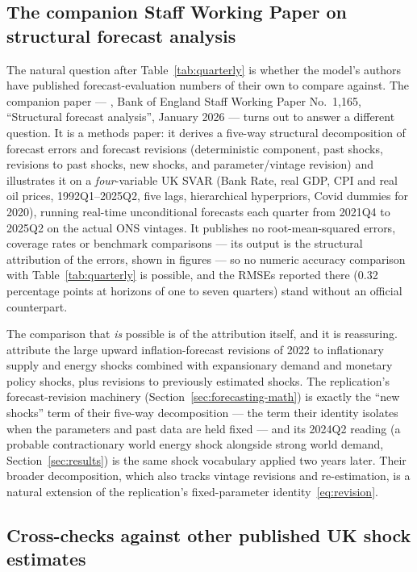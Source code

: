 \subsection{The companion Staff Working Paper on structural forecast analysis}
\label{sec:comparison-swp}

The natural question after Table~\ref{tab:quarterly} is whether the model's authors have published forecast-evaluation numbers of their own to compare against. The companion paper --- \citet{brignone2026}, Bank of England Staff Working Paper No.~1{,}165, ``Structural forecast analysis'', January 2026 --- turns out to answer a different question. It is a methods paper: it derives a five-way structural decomposition of forecast errors and forecast revisions (deterministic component, past shocks, revisions to past shocks, new shocks, and parameter/vintage revision) and illustrates it on a \emph{four}-variable UK SVAR (Bank Rate, real GDP, CPI and real oil prices, 1992Q1--2025Q2, five lags, hierarchical \citealp{giannone2015} hyperpriors, Covid dummies for 2020), running real-time unconditional forecasts each quarter from 2021Q4 to 2025Q2 on the actual ONS vintages. It publishes no root-mean-squared errors, coverage rates or benchmark comparisons --- its output is the structural attribution of the errors, shown in figures --- so no numeric accuracy comparison with Table~\ref{tab:quarterly} is possible, and the RMSEs reported there (0.32 percentage points at horizons of one to seven quarters) stand without an official counterpart.

The comparison that \emph{is} possible is of the attribution itself, and it is reassuring. \citet{brignone2026} attribute the large upward inflation-forecast revisions of 2022 to inflationary supply and energy shocks combined with expansionary demand and monetary policy shocks, plus revisions to previously estimated shocks. The replication's forecast-revision machinery (Section~\ref{sec:forecasting-math}) is exactly the ``new shocks'' term of their five-way decomposition --- the term their identity isolates when the parameters and past data are held fixed --- and its 2024Q2 reading (a probable contractionary world energy shock alongside strong world demand, Section~\ref{sec:results}) is the same shock vocabulary applied two years later. Their broader decomposition, which also tracks vintage revisions and re-estimation, is a natural extension of the replication's fixed-parameter identity~\eqref{eq:revision}.

\subsection{Cross-checks against other published UK shock estimates}
\label{sec:comparison-shocks}

